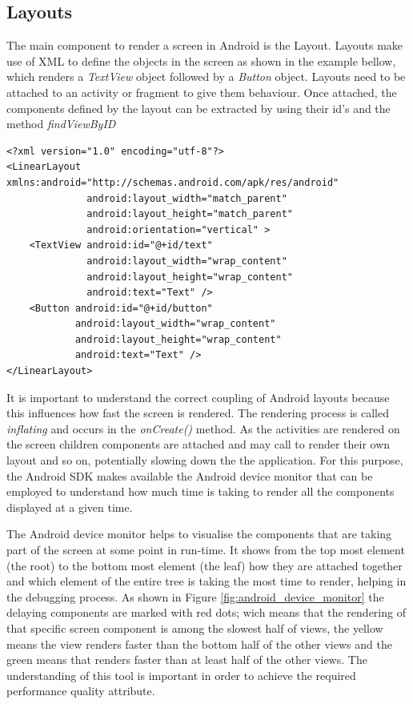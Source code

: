 \subsection{Layouts}
The main component to render a screen in Android is the Layout. Layouts make use of XML to define the objects in the screen as shown in the example bellow, which renders a \textit{TextView} object followed by a \textit{Button} object. Layouts need to be attached to an activity or fragment to give them behaviour. Once attached, the components defined by the layout can be extracted by using their id's and the method \textit{findViewByID}
\begin{verbatim}
<?xml version="1.0" encoding="utf-8"?>
<LinearLayout xmlns:android="http://schemas.android.com/apk/res/android"
              android:layout_width="match_parent"
              android:layout_height="match_parent"
              android:orientation="vertical" >
    <TextView android:id="@+id/text"
              android:layout_width="wrap_content"
              android:layout_height="wrap_content"
              android:text="Text" />
    <Button android:id="@+id/button"
            android:layout_width="wrap_content"
            android:layout_height="wrap_content"
            android:text="Text" />
</LinearLayout>
\end{verbatim}

It is important to understand the correct coupling of Android layouts because this influences how fast the screen is rendered. The rendering process is called \textit{inflating} and occurs in the \textit{onCreate()} method. As the activities are rendered on the screen children components are attached and may call to render their own layout and so on, potentially slowing down the the application. For this purpose, the Android SDK makes available the Android device monitor that can be employed to understand how much time is taking to render all the components displayed at a given time. 

The Android device monitor helps to visualise the components that are taking part of the screen at some point in run-time. It shows from the top most element (the root) to the bottom most element (the leaf) how they are attached together and which element of the entire tree is taking the most time to render, helping in the debugging process. As shown in Figure \ref{fig:android_device_monitor} the delaying components are marked with red dots; wich means that the rendering of that specific screen component is among the slowest half of views, the yellow means the view renders faster than the bottom half of the other views and the green means that renders faster than at least half of the other views. The understanding of this tool is important in order to achieve the required performance quality attribute. 


